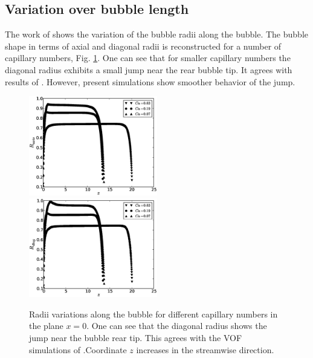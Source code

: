 \documentclass{article}
\begin{document}
\subsection{Variation over bubble length}
The work of \citet{wang-non-circular} shows the variation of the bubble
radii along the
bubble. The bubble shape in terms of axial and diagonal radii is reconstructed for a number of
capillary numbers, Fig. \ref{fig:bubble:variation:capillaries}. One can see that for smaller
capillary numbers the diagonal radius exhibits a small jump near the rear bubble tip. It agrees
with results of \citet{wang-non-circular}. However, present simulations show smoother behavior of
the jump.  
\begin{figure}[ht]
\includegraphics[width=0.5\textwidth]{Figures/bubble_rad_axis.eps}
\includegraphics[width=0.5\textwidth]{Figures/bubble_rad_diag.eps}\\
\caption{Radii variations along the bubble for different capillary numbers in the plane $x=0$.
One can see that the diagonal radius shows the jump near the bubble rear tip. This agrees with the
VOF simulations of \citet{wang-non-circular}.Coordinate $z$ increases in the streamwise direction.
\label{fig:bubble:variation:capillaries}}
\end{figure}
\end{document}
